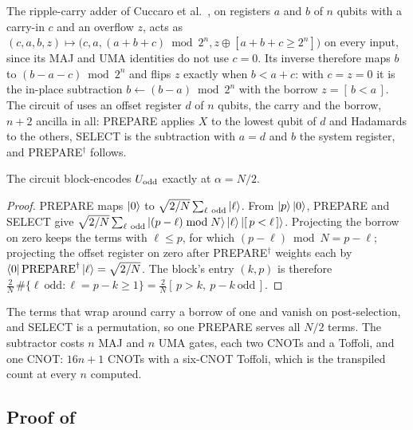 The ripple-carry adder of Cuccaro et al.\ \cite{cuccaro2004adder}, on registers $a$ and $b$ of $n$ qubits with a carry-in $c$ and an overflow $z$, acts as $(c,a,b,z)\mapsto\bigl(c,a,(a+b+c)\bmod2^n,z\oplus[a+b+c\ge2^n]\bigr)$ on every input, since its MAJ and UMA identities do not use $c=0$. Its inverse therefore maps $b$ to $(b-a-c)\bmod2^n$ and flips $z$ exactly when $b<a+c$: with $c=z=0$ it is the in-place subtraction $b\leftarrow(b-a)\bmod2^n$ with the borrow $z=[\,b<a\,]$. The circuit of  uses an offset register $d$ of $n$ qubits, the carry and the borrow, $n+2$ ancilla in all: PREPARE applies $X$ to the lowest qubit of $d$ and Hadamards to the others, SELECT is the subtraction with $a=d$ and $b$ the system register, and PREPARE$^\dagger$ follows.

\begin{lemma}
\label{lem:uodd-select}
The circuit block-encodes $U_{\mathrm{odd}}$ exactly at $\alpha=N/2$.
\end{lemma}
\begin{proof}
PREPARE maps $\ket0$ to $\sqrt{2/N}\sum_{\ell\ \text{odd}}\ket\ell$. From $\ket p\ket0$, PREPARE and SELECT give $\sqrt{2/N}\sum_{\ell\ \text{odd}}\ket{(p-\ell)\bmod N}\ket\ell\ket{[\,p<\ell\,]}$. Projecting the borrow on zero keeps the terms with $\ell\le p$, for which $(p-\ell)\bmod N=p-\ell$; projecting the offset register on zero after PREPARE$^\dagger$ weights each by $\bra0\mathrm{PREPARE}^\dagger\ket\ell=\sqrt{2/N}$. The block's entry $(k,p)$ is therefore $\tfrac2N\,\#\{\ell\ \text{odd}:\ell=p-k\ge1\}=\tfrac2N[\,p>k,\ p-k\ \text{odd}\,]$.
\end{proof}

The terms that wrap around carry a borrow of one and vanish on post-selection, and SELECT is a permutation, so one PREPARE serves all $N/2$ terms. The subtractor costs $n$ MAJ and $n$ UMA gates, each two CNOTs and a Toffoli, and one CNOT: $16n+1$ CNOTs with a six-CNOT Toffoli, which is the transpiled count at every $n$ computed.

\subsection{Proof of \texorpdfstring{}{the cost of the structured encoding}}
\label{app:proof-standard-cost}

